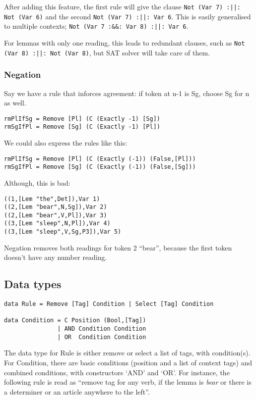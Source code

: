 \documentclass[a4paper, 11pt]{article}
\begin{document}
After adding this feature, the first rule will give the clause
\texttt{Not (Var 7) :||: Not (Var 6)} and the second \texttt{Not (Var
  7) :||: Var 6}.
This is easily generalised to multiple contexts; \texttt{Not (Var
  7 :&&: Var 8) :||: Var 6}.

For lemmas with only one reading, this leads to redundant clauses,
such as \texttt{Not (Var 8) :||: Not (Var 8)}, but SAT solver will
take care of them.

\subsubsection{Negation}

Say we have a rule that inforces agreement: if token at n-1 is Sg,
choose Sg for n as well.

\begin{lstlisting}
rmPlIfSg = Remove [Pl] (C (Exactly -1) [Sg])
rmSgIfPl = Remove [Sg] (C (Exactly -1) [Pl])
\end{lstlisting}

We could also express the rules like this:
\begin{lstlisting}
rmPlIfSg = Remove [Pl] (C (Exactly (-1)) (False,[Pl]))
rmSgIfPl = Remove [Sg] (C (Exactly (-1)) (False,[Sg]))
\end{lstlisting}

Although, this is bad: 
\begin{lstlisting}
((1,[Lem "the",Det]),Var 1)
((2,[Lem "bear",N,Sg]),Var 2)
((2,[Lem "bear",V,Pl]),Var 3)
((3,[Lem "sleep",N,Pl]),Var 4)
((3,[Lem "sleep",V,Sg,P3]),Var 5)
\end{lstlisting}

Negation removes both readings for token 2 ``bear'', because the first
token doesn't have any number reading.

\subsection{Data types}

\begin{lstlisting}
data Rule = Remove [Tag] Condition | Select [Tag] Condition

data Condition = C Position (Bool,[Tag])
               | AND Condition Condition
               | OR  Condition Condition 
\end{lstlisting}

The data type for Rule is either remove or select a list of tags, with condition(s).
For Condition, there are basic conditions (position and a list of context tags) and combined conditions, with constructors `AND' and `OR'. For instance, the following rule is read as ``remove tag for any verb, if the lemma is \emph{bear} or there is a determiner or an article anywhere to the left''.
\end{document}

